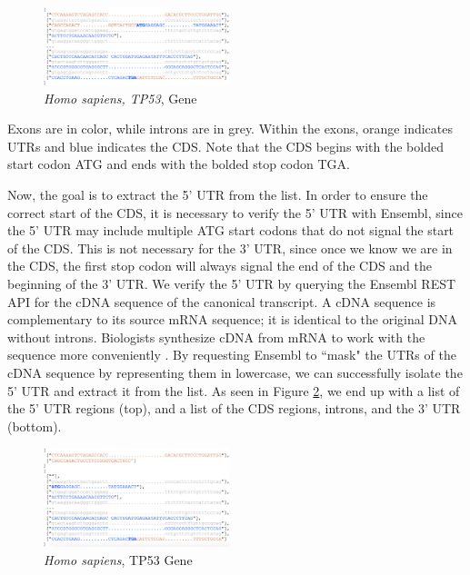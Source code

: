 \documentclass[letterpaper]{article}
\begin{document}
\begin{figure}[h!]
\centering
\vspace{-3mm}
\includegraphics[width=0.48\textwidth]{images/pre_processed_seq_homo_sapiens_tp53_ABBREV}
  \caption{\textit{Homo sapiens, TP53}, Gene}\label{fig:pre_processed_seq_homo_sapiens_tp53}
  \vspace{-6mm}
\end{figure}

Exons are in color, while introns are in grey. Within the exons, orange indicates UTRs and blue indicates the CDS. Note that the CDS begins with the bolded start codon ATG and ends with the bolded stop codon TGA.

Now, the goal is to extract the 5’ UTR from the list. In order to ensure the correct start of the CDS, it is necessary to verify the 5’ UTR with Ensembl, since the 5' UTR may include multiple ATG start codons that do not signal the start of the CDS. This is not necessary for the 3’ UTR, since once we know we are in the CDS, the first stop codon will always signal the end of the CDS and the beginning of the 3’ UTR. We verify the 5’ UTR by querying the Ensembl REST API for the cDNA sequence of the canonical transcript. A cDNA sequence is complementary to its source mRNA sequence; it is identical to the original DNA without introns. Biologists synthesize cDNA from mRNA to work with the sequence more conveniently \cite{ensembl_glossary}. By requesting Ensembl to ``mask" the UTRs of the cDNA sequence by representing them in lowercase, we can successfully isolate the 5’ UTR and extract it from the list. As seen in Figure \ref{fig:post_processed_seq_homo_sapiens_tp53}, we end up with a list of the 5’ UTR regions (top), and a list of the CDS regions, introns, and the 3’ UTR (bottom).

\begin{figure}[h!]
\centering
\vspace{-3mm}
\includegraphics[width=0.48\textwidth]{images/post_processed_seq_homo_sapiens_tp53_ABBREV}
  \caption{\textit{Homo sapiens}, TP53 Gene}\label{fig:post_processed_seq_homo_sapiens_tp53}
  \vspace{-3mm}
\end{figure}
\end{document}
